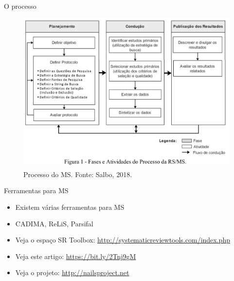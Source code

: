 \begin{frame}{O processo}
\begin{figure}
\centering
\includegraphics[scale=0.3]{figs/02/ms}
\caption{Processo do MS. Fonte: Salbo, 2018.}
\end{figure}
\end{frame}

\begin{frame}{Ferramentas para MS}
\begin{itemize}
\item Existem várias ferramentas para MS
\item CADIMA, ReLiS, Parsifal
\item Veja o espaço SR Toolbox: \url{http://systematicreviewtools.com/index.php}
\item Veja este artigo: \url{https://bit.ly/2Tnj9gM}
\item Veja o projeto: \url{http://nailsproject.net}
\end{itemize}
\end{frame}

